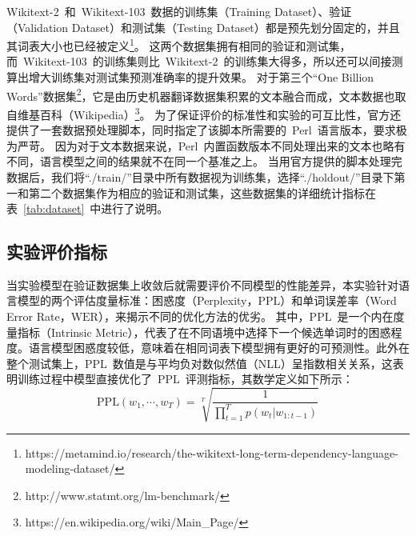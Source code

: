 Wikitext-2~和~Wikitext-103~数据的训练集（Training Dataset）、验证（Validation Dataset）和测试集（Testing Dataset）都是预先划分固定的，并且其词表大小也已经被定义\footnote{https://metamind.io/research/the-wikitext-long-term-dependency-language-modeling-dataset/}。
这两个数据集拥有相同的验证和测试集，而~Wikitext-103~的训练集则比~Wikitext-2~的训练集大得多，所以还可以间接测算出增大训练集对测试集预测准确率的提升效果。
对于第三个``One Billion Words''数据集\footnote{http://www.statmt.org/lm-benchmark/}，它是由历史机器翻译数据集积累的文本融合而成，文本数据也取自维基百科（Wikipedia）\footnote{https://en.wikipedia.org/wiki/Main\_Page/}。
为了保证评价的标准性和实验的可互比性，官方还提供了一套数据预处理脚本，同时指定了该脚本所需要的~Perl~语言版本，要求极为严苛。
因为对于文本数据来说，Perl~内置函数版本不同处理出来的文本也略有不同，语言模型之间的结果就不在同一个基准之上。
当用官方提供的脚本处理完数据后，我们将``./train/''目录中所有数据视为训练集，选择``./holdout/''目录下第一和第二个数据集作为相应的验证和测试集，这些数据集的详细统计指标在表~\ref{tab:dataset}~中进行了说明。

\subsection{实验评价指标}
当实验模型在验证数据集上收敛后就需要评价不同模型的性能差异，本实验针对语言模型的两个评估度量标准：困惑度（Perplexity，$ \mathrm{PPL} $）和单词误差率（Word Error Rate，$\mathrm{WER} $），来揭示不同的优化方法的优劣。
其中，$ \mathrm{PPL}$~是一个内在度量指标（Intrinsic Metric），代表了在不同语境中选择下一个候选单词时的困惑程度。语言模型困惑度较低，意味着在相同词表下模型拥有更好的可预测性。此外在整个测试集上，$\mathrm{PPL}$~数值是与平均负对数似然值（NLL）呈指数相关关系，这表明训练过程中模型直接优化了~$ \mathrm{PPL} $~评测指标，其数学定义如下所示：
\begin{equation}\label{equ:ppl}
   \mathrm{PPL}(w_1,\cdots,w_T)=\sqrt[T]{\frac{1}{\prod_{t=1}^T p(w_t|w_{1:t-1})}}
\end{equation}

